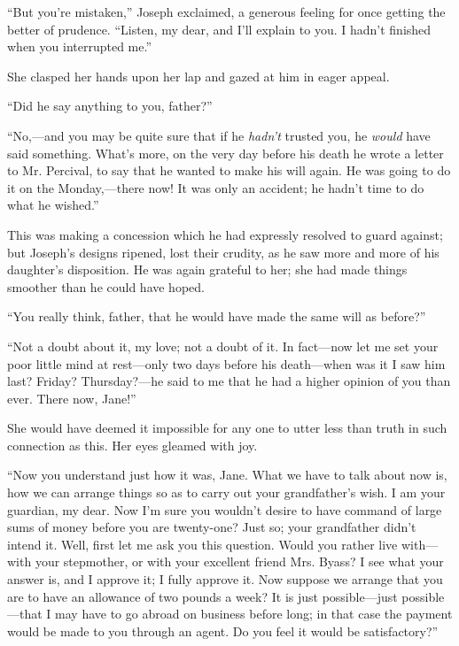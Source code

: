 ``But you're mistaken,'' Joseph exclaimed, a generous feeling for once
getting the better of prudence. ``Listen, my dear, and I'll explain to
you. I hadn't finished when you interrupted me.''

She clasped her hands upon her lap and gazed at him in eager appeal.

``Did he say anything to you, father?''

``No,---and you may be quite sure that if he \emph{hadn't} trusted you,
he \emph{would} have said something. What's more, on the very day before
his death he wrote a letter to Mr. Percival, to say that he wanted to
make his will again. He was going to do it on the Monday,---there now!
It was only an accident; he hadn't time to do what he wished.''

{\protect\hypertarget{232}{}{}}This was making a concession which he had
expressly resolved to guard against; but Joseph's designs ripened, lost
their crudity, as he saw more and more of his daughter's disposition. He
was again grateful to her; she had made things smoother than he could
have hoped.

``You really think, father, that he would have made the same will as
before?''

``Not a doubt about it, my love; not a doubt of it. In fact---now let me
set your poor little mind at rest---only two days before his
death---when was it I saw him last? Friday? Thursday?---he said to me
that he had a higher opinion of you than ever. There now, Jane!''

She would have deemed it impossible for any one to utter less than truth
in such connection as this. Her eyes gleamed with joy.

``Now you understand just how it was, Jane. What we have to talk about
now is, how we can arrange things so as to carry out your grandfather's
wish. I am your guardian, my dear. Now I'm sure you wouldn't desire to
have command of large sums of money before you are twenty-one? Just so;
your {\protect\hypertarget{233}{}{}}grandfather didn't intend it. Well,
first let me ask you this question. Would you rather live with---with
your stepmother, or with your excellent friend Mrs. Byass? I see what
your answer is, and I approve it; I fully approve it. Now suppose we
arrange that you are to have an allowance of two pounds a week? It is
just possible---just possible---that I may have to go abroad on business
before long; in that case the payment would be made to you through an
agent. Do you feel it would be satisfactory?''

